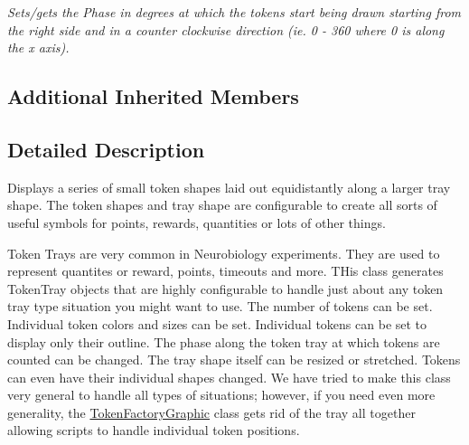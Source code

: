 \begin{DoxyCompactItemize}
\begin{DoxyCompactList}\small\item\em Sets/gets the Phase in degrees at which the tokens start being drawn starting from the right side and in a counter clockwise direction (ie. 0 -\/ 360 where 0 is along the x axis). \end{DoxyCompactList}\end{DoxyCompactItemize}
\subsection*{Additional Inherited Members}


\subsection{Detailed Description}
Displays a series of small token shapes laid out equidistantly along a larger tray shape. The token shapes and tray shape are configurable to create all sorts of useful symbols for points, rewards, quantities or lots of other things. 

Token Trays are very common in Neurobiology experiments. They are used to represent quantites or reward, points, timeouts and more. T\-His class generates Token\-Tray objects that are highly configurable to handle just about any token tray type situation you might want to use. The number of tokens can be set. Individual token colors and sizes can be set. Individual tokens can be set to display only their outline. The phase along the token tray at which tokens are counted can be changed. The tray shape itself can be resized or stretched. Tokens can even have their individual shapes changed. We have tried to make this class very general to handle all types of situations; however, if you need even more generality, the \hyperlink{class_picto_1_1_token_factory_graphic}{Token\-Factory\-Graphic} class gets rid of the tray all together allowing scripts to handle individual token positions.

